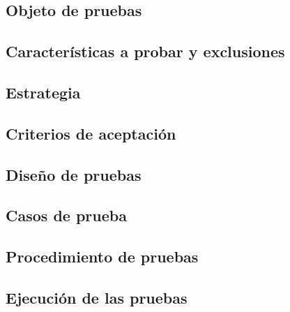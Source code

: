 \subsection{Objeto de pruebas}

\subsection{Características a probar y exclusiones}

\subsection{Estrategia}

\subsection{Criterios de aceptación}

\subsection{Diseño de pruebas}

\subsection{Casos de prueba}

\subsection{Procedimiento de pruebas}

\subsection{Ejecución de las pruebas}